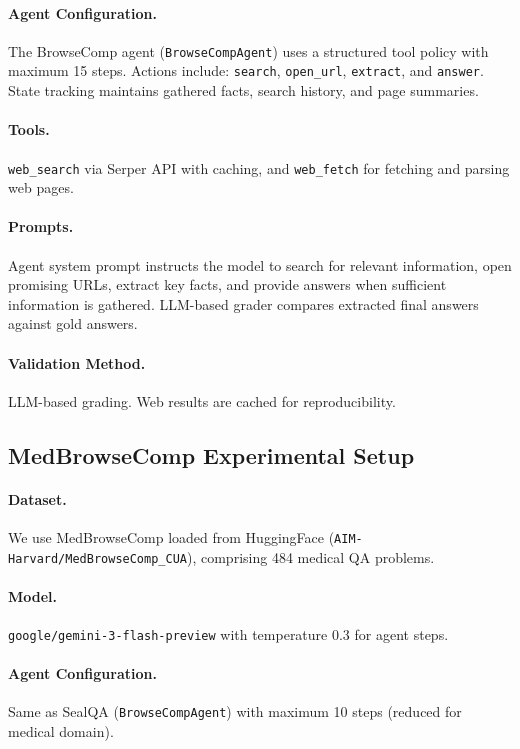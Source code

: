 \documentclass{article}
\theoremstyle{plain}
\theoremstyle{definition}
\theoremstyle{remark}
\begin{document}
\paragraph{Agent Configuration.}
The BrowseComp agent (\texttt{BrowseCompAgent}) uses a structured tool policy with maximum 15 steps. Actions include: \texttt{search}, \texttt{open\_url}, \texttt{extract}, and \texttt{answer}. State tracking maintains gathered facts, search history, and page summaries.

\paragraph{Tools.}
\texttt{web\_search} via Serper API with caching, and \texttt{web\_fetch} for fetching and parsing web pages.

\paragraph{Prompts.}
Agent system prompt instructs the model to search for relevant information, open promising URLs, extract key facts, and provide answers when sufficient information is gathered. LLM-based grader compares extracted final answers against gold answers.

\paragraph{Validation Method.}
LLM-based grading. Web results are cached for reproducibility.

\subsection{MedBrowseComp Experimental Setup}

\paragraph{Dataset.}
We use MedBrowseComp \cite{chen2025medbrowsecomp} loaded from HuggingFace (\texttt{AIM-Harvard/MedBrowseComp\_CUA}), comprising 484 medical QA problems.

\paragraph{Model.}
\texttt{google/gemini-3-flash-preview} with temperature 0.3 for agent steps.

\paragraph{Agent Configuration.}
Same as SealQA (\texttt{BrowseCompAgent}) with maximum 10 steps (reduced for medical domain).
\end{document}
